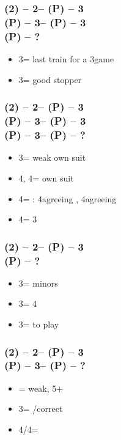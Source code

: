 \documentclass[12pt, a4paper]{article}
\begin{document}
\subsubsection*{(2\hearts) -- 2\nt -- (P) -- 3\clubs \\
                (P) -- 3\diams -- (P) -- 3\hearts \\
                (P) -- ?}
\begin{itemize}
    \item 3\spades = last train for a 3\nt game
    \item 3\nt = good \hearts stopper
\end{itemize}

\subsubsection*{(2\hearts) -- 2\nt -- (P) -- 3\clubs \\
                (P) -- 3\diams -- (P) -- 3\hearts \\
                (P) -- 3\spades -- (P) -- ?}
\begin{itemize}
    \item 3\nt = weak own suit
    \item 4\clubs, 4\diams = own suit
    \item 4\hearts = \minor: 4\spades agreeing \clubs, 4\nt agreeing \diams
    \item 4\spades = 3\spades
\end{itemize}

\subsubsection*{(2\hearts) -- 2\nt -- (P) -- 3\diams \\
                (P) -- ?}
\begin{itemize}
    \item 3\hearts = minors
    \item 3\spades = 4\spades
    \item 3\nt = to play
\end{itemize}

\subsubsection*{(2\hearts) -- 2\nt -- (P) -- 3\hearts \\
                (P) -- 3\spades -- (P) -- ?}
\begin{itemize}
    \item \pass = weak, 5+\spades
    \item 3\nt = \pass/correct
    \item 4\clubs/4\diams = \nat
\end{itemize}
\end{document}
